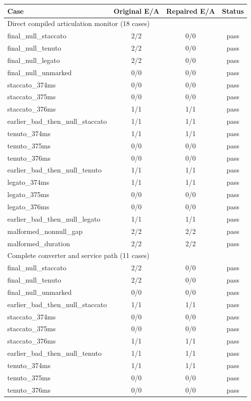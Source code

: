 \begin{tabular}{lccc}
\hline
Case & Original E/A & Repaired E/A & Status \\
\hline
\multicolumn{4}{l}{Direct compiled articulation monitor (18 cases)} \\
\hline
final\_null\_staccato & 2/2 & 0/0 & pass \\
final\_null\_tenuto & 2/2 & 0/0 & pass \\
final\_null\_legato & 2/2 & 0/0 & pass \\
final\_null\_unmarked & 0/0 & 0/0 & pass \\
staccato\_374ms & 0/0 & 0/0 & pass \\
staccato\_375ms & 0/0 & 0/0 & pass \\
staccato\_376ms & 1/1 & 1/1 & pass \\
earlier\_bad\_then\_null\_staccato & 1/1 & 1/1 & pass \\
tenuto\_374ms & 1/1 & 1/1 & pass \\
tenuto\_375ms & 0/0 & 0/0 & pass \\
tenuto\_376ms & 0/0 & 0/0 & pass \\
earlier\_bad\_then\_null\_tenuto & 1/1 & 1/1 & pass \\
legato\_374ms & 1/1 & 1/1 & pass \\
legato\_375ms & 0/0 & 0/0 & pass \\
legato\_376ms & 0/0 & 0/0 & pass \\
earlier\_bad\_then\_null\_legato & 1/1 & 1/1 & pass \\
malformed\_nonnull\_gap & 2/2 & 2/2 & pass \\
malformed\_duration & 2/2 & 2/2 & pass \\
\hline
\multicolumn{4}{l}{Complete converter and service path (11 cases)} \\
\hline
final\_null\_staccato & 2/2 & 0/0 & pass \\
final\_null\_tenuto & 2/2 & 0/0 & pass \\
final\_null\_unmarked & 0/0 & 0/0 & pass \\
earlier\_bad\_then\_null\_staccato & 1/1 & 1/1 & pass \\
staccato\_374ms & 0/0 & 0/0 & pass \\
staccato\_375ms & 0/0 & 0/0 & pass \\
staccato\_376ms & 1/1 & 1/1 & pass \\
earlier\_bad\_then\_null\_tenuto & 1/1 & 1/1 & pass \\
tenuto\_374ms & 1/1 & 1/1 & pass \\
tenuto\_375ms & 0/0 & 0/0 & pass \\
tenuto\_376ms & 0/0 & 0/0 & pass \\
\hline
\end{tabular}
